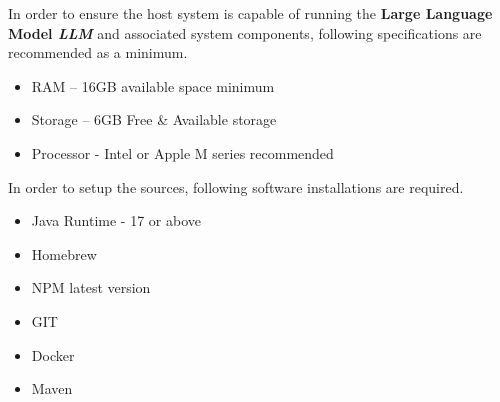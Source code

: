 

In order to ensure the host system is capable of running the \textbf{Large Language Model \emph{LLM}} and associated system components, following specifications are recommended as a minimum.

\begin{itemize}
    \item RAM -- 16GB available space minimum
    \item Storage -- 6GB Free \& Available storage
    \item Processor - Intel or Apple M series recommended
\end{itemize}


In order to setup the sources, following software installations are required.

\begin{itemize}
    \item Java Runtime - 17 or above
    \item Homebrew
    \item NPM latest version
    \item GIT
    \item Docker
    \item Maven
\end{itemize}

